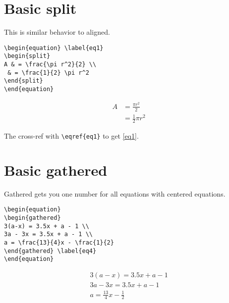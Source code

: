 \documentclass[
  letterpaper,
  DIV=11,
  numbers=noendperiod]{scrreprt}
\begin{document}
\section{Basic split}\label{basic-split}

This is similar behavior to aligned.

\begin{verbatim}
\begin{equation} \label{eq1}
\begin{split}
A & = \frac{\pi r^2}{2} \\
 & = \frac{1}{2} \pi r^2
\end{split}
\end{equation}
\end{verbatim}

\begin{equation} \label{eq1}
\begin{split}
A & = \frac{\pi r^2}{2} \\
 & = \frac{1}{2} \pi r^2
\end{split}
\end{equation}

The cross-ref with \texttt{\textbackslash{}eqref\{eq1\}} to get
\eqref{eq1}.

\section{Basic gathered}\label{basic-gathered}

Gathered gets you one number for all equations with centered equations.

\begin{verbatim}
\begin{equation}  
\begin{gathered}
3(a-x) = 3.5x + a - 1 \\
3a - 3x = 3.5x + a - 1 \\
a = \frac{13}{4}x - \frac{1}{2}
\end{gathered} \label{eq4}
\end{equation}
\end{verbatim}

\begin{equation}  
\begin{gathered}
3(a-x) = 3.5x + a - 1 \\
3a - 3x = 3.5x + a - 1 \\
a = \frac{13}{4}x - \frac{1}{2}
\end{gathered} \label{eq4}
\end{equation}
\end{document}
